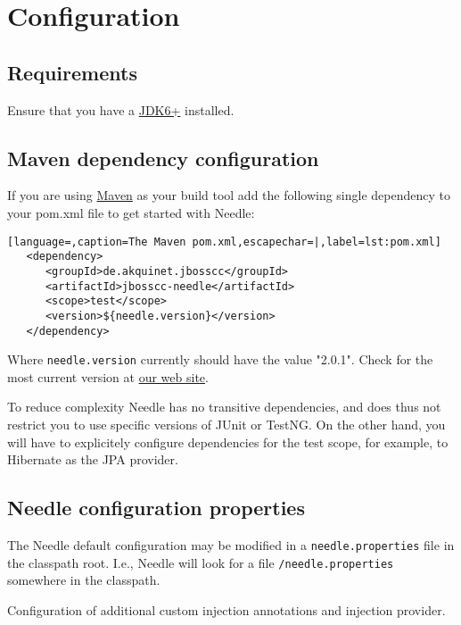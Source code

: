 \chapter{Configuration}

\section{Requirements}

Ensure that you have a 
\href{http://www.oracle.com/technetwork/java/javase/downloads/index.html}{JDK6+} installed.

\section{Maven dependency configuration}
If you are using \href{http://maven.apache.org/}{Maven} as your build tool add the following single dependency to your pom.xml file to get started with Needle:

\begin{lstlisting}[language=,caption=The Maven pom.xml,escapechar=|,label=lst:pom.xml]
   <dependency>
      <groupId>de.akquinet.jbosscc</groupId>
      <artifactId>jbosscc-needle</artifactId>
      <scope>test</scope>
      <version>${needle.version}</version>
   </dependency>
\end{lstlisting}

Where \verb|needle.version| currently should have the value "2.0.1". Check for the most current version at \href{http://needle.sourceforge.net}{our web site}.

To reduce complexity Needle has no transitive dependencies, and does thus not restrict you to use specific versions of JUnit or TestNG.
On the other hand, you will have to explicitely configure dependencies for the test scope, for example, to Hibernate as the JPA provider.

\section{Needle configuration properties}

The Needle default configuration may be modified in a \verb|needle.properties| file in the classpath root. I.e., Needle will look for a file 
\verb|/needle.properties| somewhere in the classpath.

\parskip 14pt
\parindent 0pt
Configuration of additional custom injection annotations and injection provider.

